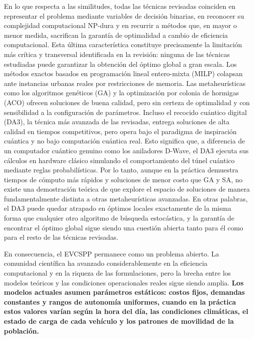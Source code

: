 \documentclass[letter, 10pt]{article}
\begin{document}
En lo que respecta a las similitudes, todas las técnicas revisadas coinciden en representar 
el problema mediante variables de decisión binarias, en reconocer su complejidad 
computacional NP-dura y en recurrir a métodos que, en mayor o menor medida, sacrifican 
la garantía de optimalidad a cambio de eficiencia computacional. Esta última característica 
constituye precisamente la limitación más crítica y transversal identificada en la revisión: 
ninguna de las técnicas estudiadas puede garantizar la obtención del óptimo global a gran 
escala. Los métodos exactos basados en programación lineal entero-mixta (MILP) colapsan 
ante instancias urbanas reales por restricciones de memoria. Las metaheurísticas como los 
algoritmos genéticos (GA) y la optimización por colonia de hormigas (ACO) ofrecen 
soluciones de buena calidad, pero sin certeza de optimalidad y con sensibilidad a la 
configuración de parámetros. Incluso el recocido cuántico digital (DA3), la técnica más 
avanzada de las revisadas, entrega soluciones de alta calidad en tiempos competitivos, 
pero opera bajo el paradigma de inspiración cuántica y no bajo computación cuántica real.
Esto significa que, a diferencia de un computador cuántico genuino como los aniladores 
D-Wave, el DA3 ejecuta sus cálculos en hardware clásico simulando el comportamiento del 
túnel cuántico mediante reglas probabilísticas. Por lo tanto, aunque en la práctica 
demuestra tiempos de cómputo más rápidos y soluciones de menor costo que GA y SA, 
no existe una demostración teórica de que explore el espacio de soluciones de manera 
fundamentalmente distinta a otras metaheurísticas avanzadas. En otras palabras, el DA3 
puede quedar atrapado en óptimos locales exactamente de la misma forma que cualquier 
otro algoritmo de búsqueda estocástica, y la garantía de encontrar el óptimo global 
sigue siendo una cuestión abierta tanto para él como para el resto de las técnicas revisadas.

En consecuencia, el EVCSPP permanece como un problema abierto. La comunidad científica 
ha avanzado considerablemente en la eficiencia computacional y en la riqueza de las 
formulaciones, pero la brecha entre los modelos teóricos y las condiciones operacionales 
reales sigue siendo amplia. \textbf{Los modelos actuales asumen parámetros estáticos: costos fijos, demandas constantes y rangos de autonomía uniformes, cuando en la práctica estos valores varían según la hora del día, las condiciones climáticas, el estado de carga de cada vehículo y los patrones de movilidad de la población.}
\end{document}
